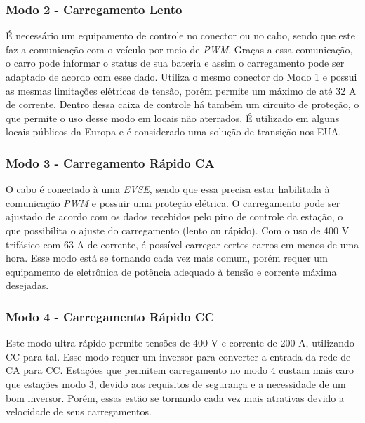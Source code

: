         \subsubsection{Modo 2 - Carregamento Lento}
        \label{stateofart:modes:europe:mode2}

        É necessário um equipamento de controle no conector ou no cabo, sendo que este faz a comunicação com o veículo por meio de \textit{\ac{PWM}}. Graças a essa comunicação, o carro pode informar o status de sua bateria e assim o carregamento pode ser adaptado de acordo com esse dado. Utiliza o mesmo conector do Modo 1 e possui as mesmas limitações elétricas de tensão, porém permite um máximo de até 32 A de corrente. Dentro dessa caixa de controle há também um circuito de proteção, o que permite o uso desse modo em locais não aterrados. É utilizado em alguns locais públicos da Europa e é considerado uma solução de transição nos EUA.

        \subsubsection{Modo 3 - Carregamento Rápido CA}
        \label{stateofart:modes:europe:mode3}

        O cabo é conectado à uma \textit{\ac{EVSE}}, sendo que essa precisa estar habilitada à comunicação \textit{\ac{PWM}} e possuir uma proteção elétrica. O carregamento pode ser ajustado de acordo com os dados recebidos pelo pino de controle da estação, o que possibilita o ajuste do carregamento (lento ou rápido). Com o uso de 400 V trifásico com 63 A de corrente, é possível carregar certos carros em menos de uma hora. Esse modo está se tornando cada vez mais comum, porém requer um equipamento de eletrônica de potência adequado à tensão e corrente máxima desejadas.

        \subsubsection{Modo 4 - Carregamento Rápido CC}
        \label{stateofart:modes:europe:mode4}

        Este modo ultra-rápido permite tensões de 400 V e corrente de 200 A, utilizando \ac{CC} para tal. Esse modo requer um inversor para converter a entrada da rede de \ac{CA} para \ac{CC}. Estações que permitem carregamento no modo 4 custam mais caro que estações modo 3, devido aos requisitos de segurança e a necessidade de um bom inversor. Porém, essas estão se tornando cada vez mais atrativas devido a velocidade de seus carregamentos.

